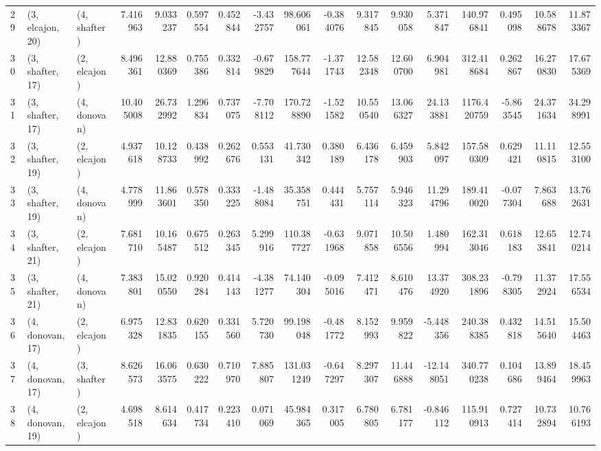 \begin{tabular}{lllrrrrrrrrrrrrrr}
29 &  (3, elcajon, 20) &     (4, shafter) &   7.416963 &   9.033237 &   0.597554 &  0.452844 &  -3.432757 &   98.606061 & -0.384076 &   9.317845 &   9.930058 &   5.371847 &   140.976841 &  0.495098 &  10.588678 &  11.873367 \\
30 &  (3, shafter, 17) &     (2, elcajon) &   8.496361 &  12.880369 &   0.755386 &  0.332814 &  -0.679829 &  158.777644 & -1.371743 &  12.582348 &  12.600700 &   6.904981 &   312.418684 &  0.262867 &  16.270830 &  17.675369 \\
31 &  (3, shafter, 17) &     (4, donovan) &  10.405008 &  26.732992 &   1.296834 &  0.737075 &  -7.708112 &  170.728890 & -1.521582 &  10.550540 &  13.066327 &  24.133881 &  1176.420759 & -5.863545 &  24.371634 &  34.298991 \\
32 &  (3, shafter, 19) &     (2, elcajon) &   4.937618 &  10.128733 &   0.438992 &  0.262676 &   0.553131 &   41.730342 &  0.380189 &   6.436178 &   6.459903 &   5.842097 &   157.580309 &  0.629421 &  11.110815 &  12.553100 \\
33 &  (3, shafter, 19) &     (4, donovan) &   4.778999 &  11.863601 &   0.578350 &  0.333225 &  -1.488084 &   35.358751 &  0.444431 &   5.757114 &   5.946323 &  11.294796 &   189.410020 & -0.077304 &   7.863688 &  13.762631 \\
34 &  (3, shafter, 21) &     (2, elcajon) &   7.681710 &  10.165487 &   0.675512 &  0.263345 &   5.299916 &  110.387727 & -0.631968 &   9.071858 &  10.506556 &   1.480994 &   162.313046 &  0.618183 &  12.653841 &  12.740214 \\
35 &  (3, shafter, 21) &     (4, donovan) &   7.383801 &  15.020550 &   0.920284 &  0.414143 &  -4.381277 &   74.140304 & -0.095016 &   7.412471 &   8.610476 &  13.374920 &   308.231896 & -0.798305 &  11.372924 &  17.556534 \\
36 &  (4, donovan, 17) &     (2, elcajon) &   6.975328 &  12.831835 &   0.620155 &  0.331560 &   5.720730 &   99.198048 & -0.481772 &   8.152993 &   9.959822 &  -5.448356 &   240.388385 &  0.432818 &  14.515640 &  15.504463 \\
37 &  (4, donovan, 17) &     (3, shafter) &   8.626573 &  16.063575 &   0.630222 &  0.710970 &   7.885807 &  131.031249 & -0.647297 &   8.297307 &  11.446888 & -12.148051 &   340.770238 &  0.104686 &  13.899464 &  18.459963 \\
38 &  (4, donovan, 19) &     (2, elcajon) &   4.698518 &   8.614634 &   0.417734 &  0.223410 &   0.071069 &   45.984365 &  0.317005 &   6.780805 &   6.781177 &  -0.846112 &   115.910913 &  0.727414 &  10.732894 &  10.766193 \\

\end{tabular}
